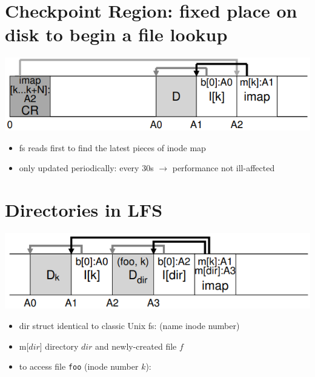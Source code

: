 \section*{Checkpoint Region: fixed place on disk to begin a file lookup}
\includegraphics[width=\linewidth]{imgs/lfs_cr}
\begin{itemize}
\item fs reads  first to find the latest pieces of inode map
\item only updated periodically: every 30s $\to$ performance not ill-affected
\end{itemize}
\section*{Directories in LFS}
\includegraphics[width=\linewidth]{imgs/lfs_dirs}
\begin{itemize}
\item dir struct identical to classic Unix fs: (name  inode number)
\item m[$dir$]  directory $dir$ and newly-created file $f$
\item to access file \texttt{foo} (inode number $k$):
\end{itemize}
